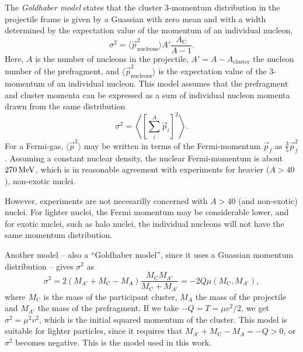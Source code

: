 The \emph{Goldhaber model} states that the cluster 3-momentum distribution in the projectile frame is given by a Guassian with zero mean and with a width determined by the expectation value of the momentum of an individual nucleon,
\begin{equation}
\sigma^2 = \langle \vec{p}_\text{nucleons}^2 \rangle A'\frac{A_\text{C}}{A-1}.
\end{equation}
Here, $A$ is the number of nucleons in the projectile, $A' = A-A_\text{cluster}$ the nucleon number of the prefragment, and $\langle \vec{p}_\text{nucleons}^2 \rangle$ is the expectation value of the 3-momentum of an individual nucleon. This model assumes that the prefragment and cluster momenta can be expressed as a sum of individual nucleon momenta drawn from the same distribution
\begin{equation}
\sigma^2 = \left\langle \left[\sum_i^A \vec{p}_i\right]^2 \right\rangle.
\end{equation}
For a Fermi-gas, $\langle \vec{p}^2 \rangle$ may be written in terms of the Fermi-momentum $\vec{p}_f$ as $\tfrac{3}{5} \vec{p}_f^2$\cite{goldhaber:1974:art}.
Assuming a constant nuclear density, the nuclear Fermi-momentum is about $\unit[270]{MeV}$, which is in reasonable agreement with experiments for heavier ($A>40$), non-exotic nuclei\cite{moniz:1971}. 

However, \rtb{} experiments are not necesarilly concerned with $A>40$ (and non-exotic) nuclei. For lighter nuclei, the Fermi momentum may be considerable lower\cite{bartke2009introduction}, and for exotic nuclei, such as halo nuclei, the individual nucleons will not have the same momentum distribution.

Another model -- also a ``Goldhaber model'', since it uses a Guassian momentum distribution -- gives $\sigma^2$ as
\begin{equation}
\sigma^2 = 2 (M_{A'} + M_\text{C} -M_A) \frac{M_\text{C}M_{A'}}{M_\text{C}+M_{A'}} = -2 Q \mu(M_\text{C},M_{A'}),
\end{equation}
where $M_\text{C}$ is the mass of the participant cluster, $M_A$ the mass of the projectile and $M_{A'}$ the mass of the prefragment. If we take $-Q=T = \mu v^2/2$, we get $\sigma^2 = \mu^2 v^2$, which is the initial squared momentum of the cluster. This model is suitable for lighter particles, since it requires that $M_{A'} + M_\text{C} -M_A = -Q >0$, or $\sigma^2$ becomes negative. This is the model used in this work.

